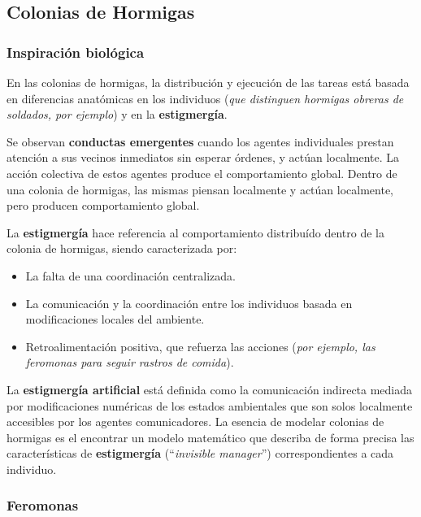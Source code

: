 \documentclass[10pt,a4paper]{article}
\begin{document}
\subsection{Colonias de Hormigas}

\subsubsection{Inspiración biológica}

En las colonias de hormigas, la distribución y ejecución de las tareas está basada en diferencias anatómicas en los individuos (\textit{que distinguen hormigas obreras de soldados, por ejemplo}) y en la \textbf{estigmergía}.

Se observan \textbf{conductas emergentes} cuando los agentes individuales prestan atención a sus vecinos inmediatos sin esperar órdenes, y actúan localmente. La acción colectiva de estos agentes produce el comportamiento global. Dentro de una colonia de hormigas, las mismas piensan localmente y  actúan localmente, pero producen comportamiento global.

La \textbf{estigmergía} hace referencia al comportamiento distribuído dentro de la colonia de hormigas, siendo caracterizada por:
\begin{itemize}
\item La falta de una coordinación centralizada.
\item La comunicación y la coordinación entre los individuos basada en modificaciones locales del ambiente.
\item Retroalimentación positiva, que refuerza las acciones (\textit{por ejemplo, las feromonas para seguir rastros de comida}).
\end{itemize}

La \textbf{estigmergía artificial} está definida como la comunicación indirecta mediada por modificaciones numéricas de los estados ambientales que son solos localmente accesibles por los agentes comunicadores. La esencia de modelar colonias de hormigas es el encontrar un modelo matemático que describa de forma precisa las características de \textbf{estigmergía} (``\textit{invisible manager}'') correspondientes a cada individuo.

\subsubsection{Feromonas}
\end{document}
